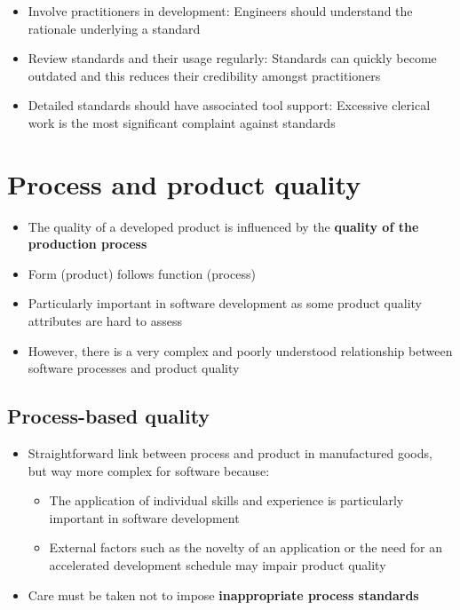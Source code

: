 \documentclass{article}
\begin{document}
\begin{itemize}
  \item Involve practitioners in development: Engineers should understand the rationale underlying a standard
  \item Review standards and their usage regularly: Standards can quickly become outdated and this reduces their credibility amongst practitioners
  \item Detailed standards should have associated tool support: Excessive clerical work is the most significant complaint against standards
\end{itemize}

\section{Process and product quality}

\begin{itemize}
  \item The quality of a developed product is influenced by the \textbf{quality of the production process}
  \item Form (product) follows function (process)
  \item Particularly important in software development as some product quality attributes are hard to assess
  \item However, there is a very complex and poorly understood relationship between software processes and product quality
\end{itemize}

\subsection{Process-based quality}

\begin{itemize}
  \item Straightforward link between process and product in manufactured goods, but way more complex for software because:
  \begin{itemize}
    \item The application of individual skills and experience is particularly
important in software development
    \item External factors such as the novelty of an application or the need for an
accelerated development schedule may impair product quality
  \end{itemize}
  \item Care must be taken not to impose \textbf{inappropriate process standards}
\end{itemize}
\end{document}
